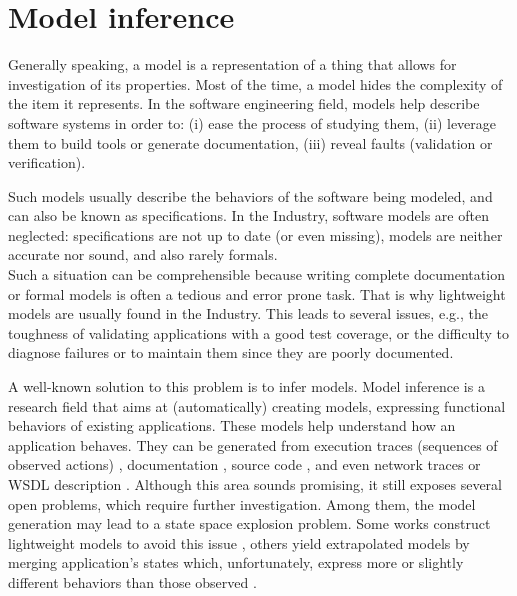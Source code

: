 \section{Model inference}
\label{sec:related:modelinf}

Generally speaking, a model is a representation of a thing that
allows for investigation of its properties. Most of the time, a
model hides the complexity of the item it represents. In the
software engineering field, models help describe software systems
in order to: (i) ease the process of studying them, (ii) leverage
them to build tools or generate documentation, (iii) reveal
faults (validation or verification).

Such models usually describe the behaviors of the software being
modeled, and can also be known as specifications. In the
Industry, software models are often neglected: specifications are
not up to date (or even missing), models are neither accurate nor
sound, and also rarely formals.\\
Such a situation can be comprehensible because writing complete
documentation or formal models is often a tedious and error prone
task. That is why lightweight models are usually found in the
Industry. This leads to several issues, e.g., the toughness of
validating applications with a good test coverage, or the
difficulty to diagnose failures or to maintain them since they
are poorly documented.

A well-known solution to this problem is to infer models. Model
inference is a research field that aims at (automatically)
creating models, expressing functional behaviors of existing
applications.  These models help understand how an application
behaves. They can be generated from execution traces (sequences
of observed actions) \cite{Krka:2010:UDE:1810295.1810324},
documentation \cite{ZhongZXM11}, source code
\cite{Salah05scenariographer,Pradel:2009}, and even network
traces \cite{6079839} or WSDL description
\cite{Bertolino:2009:ASB:1595696.1595719}. Although this area
sounds promising, it still exposes several open problems, which
require further investigation. Among them, the model generation
may lead to a state space explosion problem. Some works construct
lightweight models to avoid this issue \cite{WPX13}, others yield
extrapolated models by merging application's states which,
unfortunately, express more or slightly different behaviors than
those observed \cite{4023976}.


